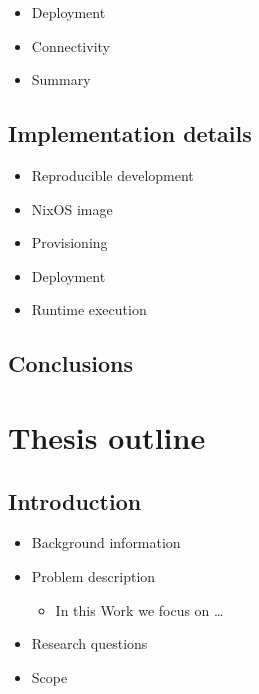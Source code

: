\begin{itemize}
\tightlist
\item
  Deployment
\item
  Connectivity
\item
  Summary
\end{itemize}

\section{Implementation details}\label{notes__05000-prep.md__implementation-details}

\begin{itemize}
\tightlist
\item
  Reproducible development
\item
  NixOS image
\item
  Provisioning
\item
  Deployment
\item
  Runtime execution
\end{itemize}

\section{Conclusions}\label{notes__05000-prep.md__conclusions}

\label{notes__06000-thesis.md}
\chapter{Thesis outline}\label{notes__06000-thesis.md__thesis-outline}

\section{Introduction}\label{notes__06000-thesis.md__introduction}

\begin{itemize}
\tightlist
\item
  Background information
\item
  Problem description

  \begin{itemize}
  \tightlist
  \item
    In this Work we focus on \ldots{}
  \end{itemize}
\item
  Research questions
\item
  Scope
\end{itemize}

